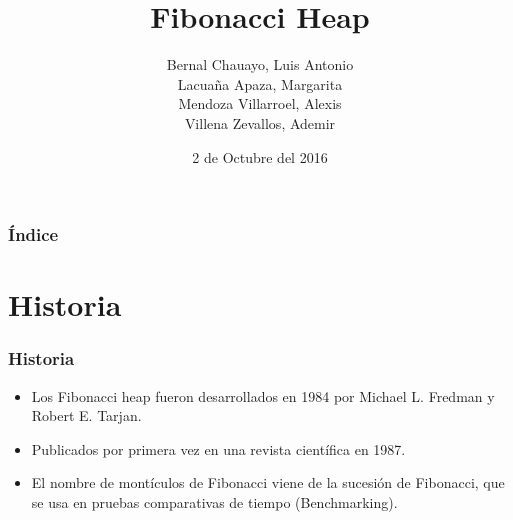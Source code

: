 \documentclass{beamer}
\title[Fibonacci Heap]{Fibonacci Heap}
\author[ALMA\and *Alexis\and Luis \and Margarita \and Ademir*]{{Bernal Chauayo, Luis Antonio}\\{Lacuaña Apaza, Margarita}\\{Mendoza Villarroel, Alexis}\\{Villena Zevallos, Ademir}}
\institute{{Ciencia de la Computación}
\\{Universidad Nacional de San Agustin}}
\date{2 de Octubre del 2016}
\begin{document}
\begin{frame}[plain]
    \titlepage
 \end{frame}
  
 \begin{frame}
  \frametitle{Índice}
  \begin{multicols}{2}
  \tableofcontents
  \end{multicols} 
\end{frame}

\section{Historia}

\begin{frame}
    \frametitle{Historia}
 \begin{itemize}
    \item Los Fibonacci heap  fueron desarrollados en 1984 por Michael L. Fredman y Robert E. Tarjan.
    \item Publicados por primera vez en una revista científica en 1987.
    \item El nombre de montículos de Fibonacci viene de la sucesión de Fibonacci, que se usa en pruebas comparativas de tiempo (Benchmarking).
\end{itemize}
\end{frame}
\end{document}
